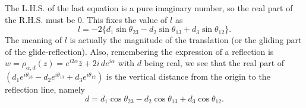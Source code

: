 \documentclass{article}
\begin{document}
The L.H.S. of the last equation is a pure imaginary number, so the real part of the R.H.S. must be $0$. 
This fixes the value of $l$ as
\begin{equation}
l = - 2 \{ d_{1} \sin{\theta_{23}} - d_{2} \sin{\theta_{13}} + d_{3} \sin{\theta_{12}}\}.
\end{equation}
The meaning of $l$ is actually the magnitude of the translation (or the gliding part of the glide-reflection).
Also, remembering the expression of a reflection is $w = \rho_{\alpha,d} (z) = e^{i2\alpha} \bar{z} + 2i \, de^{i\alpha}$ with $d$ being real, 
we see that the real part of $( d_{1} e^{i\theta_{23}} - d_{2} e^{i\theta_{13}} + d_{3} e^{i\theta_{12}})$ is the vertical distance from the origin to the reflection line, namely
\begin{equation}
d = d_{1} \cos{\theta_{23}} - d_{2} \cos{\theta_{13}} + d_{3} \cos{\theta_{12}}.
\end{equation}
\end{document}
